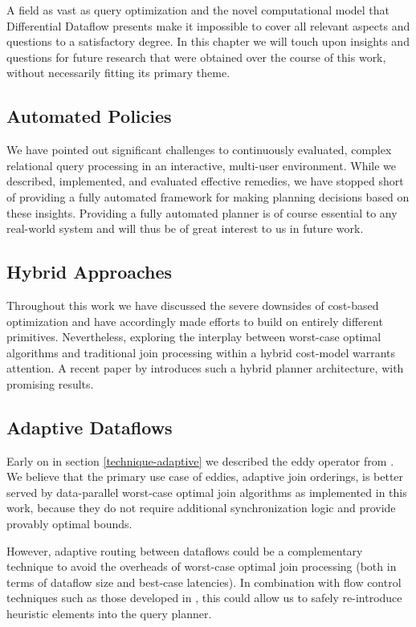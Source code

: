 \documentclass[../index.tex]{subfiles}
\begin{document}
A field as vast as query optimization and the novel computational
model that Differential Dataflow presents make it impossible to cover
all relevant aspects and questions to a satisfactory degree. In this
chapter we will touch upon insights and questions for future research
that were obtained over the course of this work, without necessarily
fitting its primary theme.

\subsection{Automated Policies}

We have pointed out significant challenges to continuously evaluated,
complex relational query processing in an interactive, multi-user
environment. While we described, implemented, and evaluated effective
remedies, we have stopped short of providing a fully automated
framework for making planning decisions based on these
insights. Providing a fully automated planner is of course essential
to any real-world system and will thus be of great interest to us in
future work.

\subsection{Hybrid Approaches}

Throughout this work we have discussed the severe downsides of
cost-based optimization and have accordingly made efforts to build on
entirely different primitives. Nevertheless, exploring the interplay
between worst-case optimal algorithms and traditional join processing
within a hybrid cost-model warrants attention. A recent paper by
\cite{mhedhbi2019optimizing} introduces such a hybrid planner
architecture, with promising results.

\subsection{Adaptive Dataflows}

Early on in section \ref{technique-adaptive} we described the eddy
operator from \cite{avnur2000eddies}. We believe that the primary use
case of eddies, adaptive join orderings, is better served by
data-parallel worst-case optimal join algorithms as implemented in
this work, because they do not require additional synchronization
logic and provide provably optimal bounds.

However, adaptive routing between dataflows could be a complementary
technique to avoid the overheads of worst-case optimal join processing
(both in terms of dataflow size and best-case latencies). In
combination with flow control techniques such as those developed in
\cite{lattuada2016faucet}, this could allow us to safely re-introduce
heuristic elements into the query planner.
\end{document}
